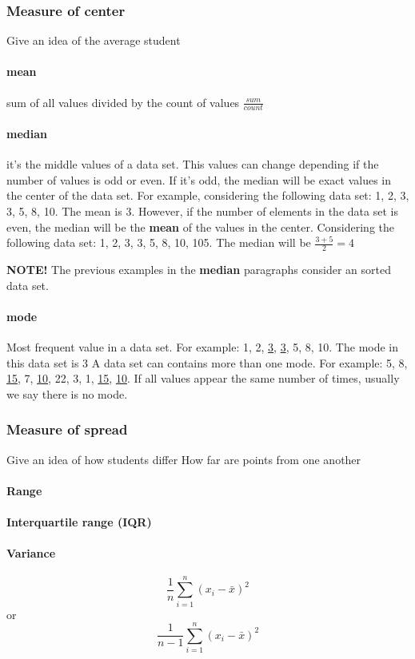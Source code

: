 \documentclass[]{article}
\begin{document}
\subsubsection{Measure of center} Give an idea of the average student
\paragraph{mean} sum of all values divided by the count of values $ \frac{sum}{count} $
\paragraph{median} it's the middle values of a data set. This values can change depending if the number of values is odd or even. If it's odd, the median will be exact values in the center of the data set. For example, considering the following data set: 1, 2, 3, 3, 5, 8, 10. The mean is 3. 
However, if the number of elements in the data set is even, the median will be the \textbf{mean} of the values in the center. Considering the following data set: 1, 2, 3, 3, 5, 8, 10, 105. The median will be $ \frac{3+5}{2} = 4 $

\textbf{NOTE!} The previous examples in the \textbf{median} paragraphs consider an sorted data set.
\paragraph{mode} Most frequent value in a data set. For example: 1, 2, \underline{3}, \underline{3}, 5, 8, 10. The mode in this data set is 3
A data set can contains more than one mode. For example: 5, 8, \underline{15}, 7, \underline{10}, 22, 3, 1, \underline{15}, \underline{10}. If all values appear the same number of times, usually we say there is no mode.

\subsubsection{Measure of spread}Give an idea of how students differ
How far are points from one another

\paragraph{Range}
\paragraph{Interquartile range (IQR)}
\paragraph{Variance} 
\[ \frac{1}{n}\sum_{i=1}^{n}(x_{i} - \bar{x})^2 \]
or
\[ \frac{1}{n-1}\sum_{i=1}^{n}(x_{i} - \bar{x})^2 \]
\end{document}
